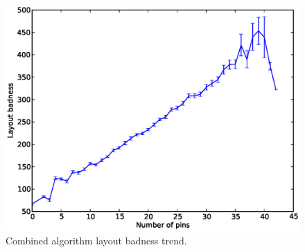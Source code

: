 \begin{figure}[H]
\begin{center}
\includegraphics[width=\textwidth]{Images/final_algorithm_badness_trend.eps}
\caption[Combined algorithm layout badness trend]{Combined algorithm layout
badness trend.}
\label{fig:final_badness_trend}
\end{center}
\end{figure}
